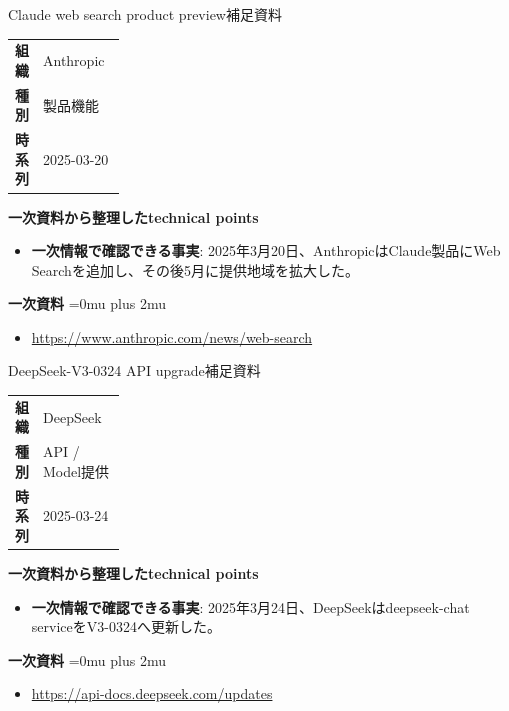 \begin{technicalnote}{Claude web search product preview}{補足資料}
\begingroup
\begin{tabularx}{\linewidth}{@{}>{\bfseries}p{0.22\linewidth}X@{}}
組織 & Anthropic \\
種別 & 製品機能 \\
時系列 & 2025-03-20 \\
\end{tabularx}
\smallskip
{\bfseries 一次資料から整理したtechnical points}
\begin{itemize}[leftmargin=1.5em,itemsep=0.35em]
\item \textbf{一次情報で確認できる事実}: 2025年3月20日、AnthropicはClaude製品にWeb Searchを追加し、その後5月に提供地域を拡大した。
\end{itemize}
\begin{samepage}
{\bfseries 一次資料}
\begingroup\sloppy
\Urlmuskip=0mu plus 2mu\relax
\begin{itemize}[leftmargin=1.5em,itemsep=0.25em]
\item {\scriptsize\url{https://www.anthropic.com/news/web-search}}
\end{itemize}
\endgroup
\end{samepage}
\endgroup
\end{technicalnote}
\medskip

\begin{technicalnote}{DeepSeek-V3-0324 API upgrade}{補足資料}
\begingroup
\begin{tabularx}{\linewidth}{@{}>{\bfseries}p{0.22\linewidth}X@{}}
組織 & DeepSeek \\
種別 & API / Model提供 \\
時系列 & 2025-03-24 \\
\end{tabularx}
\smallskip
{\bfseries 一次資料から整理したtechnical points}
\begin{itemize}[leftmargin=1.5em,itemsep=0.35em]
\item \textbf{一次情報で確認できる事実}: 2025年3月24日、DeepSeekはdeepseek-chat serviceをV3-0324へ更新した。
\end{itemize}
\begin{samepage}
{\bfseries 一次資料}
\begingroup\sloppy
\Urlmuskip=0mu plus 2mu\relax
\begin{itemize}[leftmargin=1.5em,itemsep=0.25em]
\item {\scriptsize\url{https://api-docs.deepseek.com/updates}}
\end{itemize}
\endgroup
\end{samepage}
\endgroup
\end{technicalnote}
\medskip

